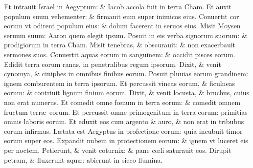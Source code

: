 \documentclass[a5paper,10pt]{book}
\def\ae{æ}
\def\oe{œ}
\begin{document}
\begin{multicols*}{2}
\newline \color{red} E\color{black}t intrauit Israel in Aegyptum: \& Iacob accola fuit in terra Cham.
\newline \color{red} E\color{black}t auxit populum suum vehementer: \& firmauit eum super inimicos eius.
\newline \color{red} C\color{black}onuertit cor eorum vt odirent populum eius: \& dolum facerent in seruos eius.
\newline \color{red} M\color{black}isit Moysen seruum suum: Aaron quem elegit ipsum.
\newline \color{red} P\color{black}osuit in eis verba signorum suorum: \& prodigiorum in terra Cham.
\newline \color{red} M\color{black}isit tenebras, \& obscurauit: \& non exacerbauit sermones suos.
\newline \color{red} C\color{black}onuertit aquas eorum in sanguinem: \& occidit pisces eorum.
\newline \color{red} E\color{black}didit terra eorum ranas, in penetralibus regum ipsorum.
\newline \color{red} D\color{black}ixit, \& venit cynomya, \& ciniphes in omnibus finibus eorum.
\newline \color{red} P\color{black}osuit pluuias eorum grandinem: ignem comburentem in terra ipsorum.
\newline \color{red} E\color{black}t percussit vineas eorum, \& ficulneas eorum: \& contriuit lignum finium eorum.
\newline \color{red} D\color{black}ixit, \& venit locusta, \& bruchus, cuius non erat numerus.
\newline \color{red} E\color{black}t comedit omne f\oe num in terra eorum: \& comedit omnem fructum terr\ae \ eorum.
\newline \color{red} E\color{black}t percussit omne primogenitum in terra eorum: primitias omnis laboris eorum.
\newline \color{red} E\color{black}t eduxit eos cum argento \& auro, \& non erat in tribubus eorum infirmus.
\newline \color{red} L\color{black}\ae tata est Aegyptus in profectione eorum: quia incubuit timor eorum super eos.
\newline \color{red} E\color{black}xpandit nubem in protectionem eorum: \& ignem vt luceret eis per noctem.
\newline \color{red} P\color{black}etierunt, \& venit coturnix: \& pane c\oe li saturauit eos.
\newline \color{red} D\color{black}irupit petram, \& fluxerunt aqu\ae : abierunt in sicco flumina.

\end{multicols*}
\end{document}
